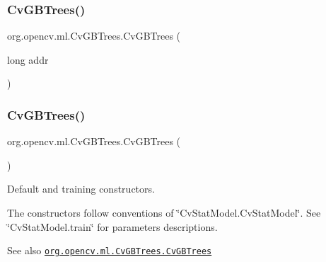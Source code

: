 \subsubsection{\texorpdfstring{Cv\+G\+B\+Trees()}{CvGBTrees()}\hspace{0.1cm}{\footnotesize\ttfamily [1/4]}}
{\footnotesize\ttfamily org.\+opencv.\+ml.\+Cv\+G\+B\+Trees.\+Cv\+G\+B\+Trees (\begin{DoxyParamCaption}\item[{long}]{addr }\end{DoxyParamCaption})\hspace{0.3cm}{\ttfamily [protected]}}

\mbox{\label{classorg_1_1opencv_1_1ml_1_1_cv_g_b_trees_a167ee377daaa83e7d946ccf21e8a1a54}} 
\subsubsection{\texorpdfstring{Cv\+G\+B\+Trees()}{CvGBTrees()}\hspace{0.1cm}{\footnotesize\ttfamily [2/4]}}
{\footnotesize\ttfamily org.\+opencv.\+ml.\+Cv\+G\+B\+Trees.\+Cv\+G\+B\+Trees (\begin{DoxyParamCaption}{ }\end{DoxyParamCaption})}

Default and training constructors.

The constructors follow conventions of \char`\"{}\+Cv\+Stat\+Model.\+Cv\+Stat\+Model\char`\"{}. See \char`\"{}\+Cv\+Stat\+Model.\+train\char`\"{} for parameters descriptions.

\begin{DoxySeeAlso}{See also}
\href{http://docs.opencv.org/modules/ml/doc/gradient_boosted_trees.html#cvgbtrees-cvgbtrees}{\tt org.\+opencv.\+ml.\+Cv\+G\+B\+Trees.\+Cv\+G\+B\+Trees} 
\end{DoxySeeAlso}
\mbox{\label{classorg_1_1opencv_1_1ml_1_1_cv_g_b_trees_acf09cb12799921e5df03a3ce320163c7}} 
